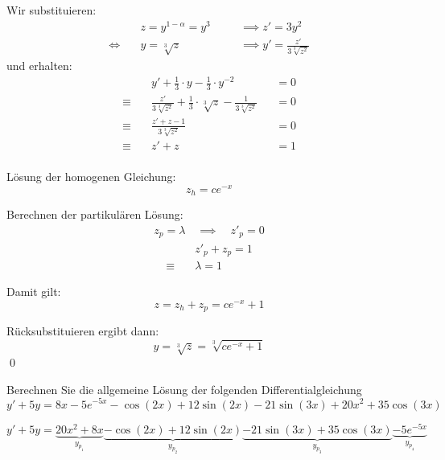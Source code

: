 \documentclass[answers]{exam}
\begin{document}
\begin{questions}
\begin{solution}
        Wir substituieren:
        $$
            \begin{aligned}
                          & z = y^{1-\alpha} = y^{3} \quad &  & \implies z' = 3y^2                      \\
                \iff\quad & y = \sqrt[3]{z} \quad          &  & \implies y' = \frac{z'}{3\sqrt[3]{z^2}}
            \end{aligned}
        $$
        und erhalten:
        $$
            \begin{aligned}
                             & y' + \frac{1}{3} \cdot y - \frac{1}{3} \cdot y^{-2}                                  &  & = 0 \\
                \equiv \quad & \frac{z'}{3\sqrt[3]{z^2}} + \frac{1}{3} \cdot \sqrt[3]{z} - \frac{1}{3\sqrt[3]{z^2}} &  & = 0 \\
                \equiv \quad & \frac{z' + z - 1}{3\sqrt[3]{z^2}}                                                    &  & = 0 \\
                \equiv \quad & z' + z                                                                               &  & = 1 \\
            \end{aligned}
        $$

        Lösung der homogenen Gleichung:
        $$
            z_h = ce^{-x}
        $$

        Berechnen der partikulären Lösung:
        $$
            \begin{aligned}
                z_p = \lambda \quad \implies \quad z'_p = 0
            \end{aligned}
        $$
        $$
            \begin{aligned}
                             & z'_p + z_p = 1 \\
                \equiv \quad & \lambda = 1
            \end{aligned}
        $$

        Damit gilt:
        $$
            z = z_h + z_p = ce^{-x} + 1
        $$

        Rücksubstituieren ergibt dann:
        $$
            y = \sqrt[3]{z} = \sqrt[3]{ce^{-x} + 1}
        $$\qed
    \end{solution}

    \newpage
    \question
    Berechnen Sie die allgemeine Lösung der folgenden Differentialgleichung
    $$
        y' + 5y = 8x - 5e^{-5x} - \cos(2x) + 12\sin(2x) - 21\sin(3x) + 20x^2 + 35\cos(3x)
    $$
    \begin{solution}
        $$
            y' + 5y = \underbrace{20x^2 + 8x}_{y_{p_1}} \underbrace{- \cos(2x) + 12\sin(2x)}_{y_{p_2}} \underbrace{- 21\sin(3x) + 35\cos(3x)}_{y_{p_3}}  \underbrace{- 5e^{-5x}}_{y_{p_4}}
        $$


\end{solution}
\end{questions}
\end{document}
